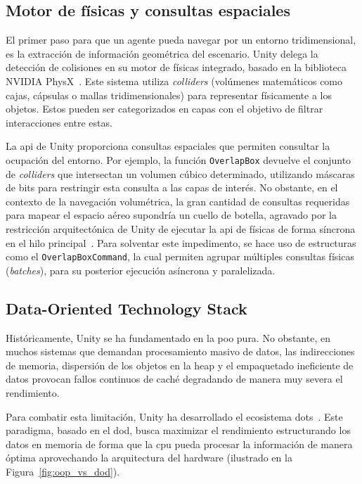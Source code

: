 \subsection{Motor de físicas y consultas espaciales}

El primer paso para que un agente pueda navegar por un entorno tridimensional, es la extracción de información geométrica del escenario.
Unity delega la detección de colisiones en su motor de físicas integrado, basado en la biblioteca NVIDIA PhysX~\cite{physx_nvidia}.
Este  sistema utiliza \textit{colliders} (volúmenes matemáticos como cajas, cápsulas o mallas tridimensionales) para representar físicamente a los objetos.
Estos pueden ser categorizados en capas con el objetivo de filtrar interacciones entre estas.

La \acrshort{api} de Unity proporciona consultas espaciales que permiten consultar la ocupación del entorno.
Por ejemplo, la función \texttt{OverlapBox} devuelve el conjunto de \textit{colliders} que intersectan un volumen cúbico determinado, utilizando máscaras de bits para restringir esta consulta a las capas de interés.
No obstante, en el contexto de la navegación volumétrica, la gran cantidad de consultas requeridas para mapear el espacio aéreo supondría un cuello de botella, agravado por la restricción arquitectónica de Unity de ejecutar la \acrshort{api} de físicas de forma síncrona en el hilo principal~\cite{unity_physics_api}.
Para solventar este impedimento, se hace uso de estructuras como el \texttt{OverlapBoxCommand}, la cual permiten agrupar múltiples consultas físicas (\textit{batches}), para su posterior ejecución asíncrona y paralelizada.

\subsection{Data-Oriented Technology Stack}
\label{sec:dots}

Históricamente, Unity se ha fundamentado en la \acrshort{poo} pura.
No obstante, en muchos sistemas que demandan procesamiento masivo de datos, las indirecciones de memoria, dispersión de los objetos en la \gls{heap} y el empaquetado ineficiente de datos provocan fallos continuos de caché degradando de manera muy severa el rendimiento.

Para combatir esta limitación, Unity ha desarrollado el ecosistema \acrfull{dots}~\cite{unity_dots}.
Este paradigma, basado en el \acrfull{dod}, busca maximizar el rendimiento estructurando los datos en memoria de forma que la \acrfull{cpu} pueda procesar la información de manera óptima aprovechando la arquitectura del hardware (ilustrado en la Figura~\ref{fig:oop_vs_dod}).

